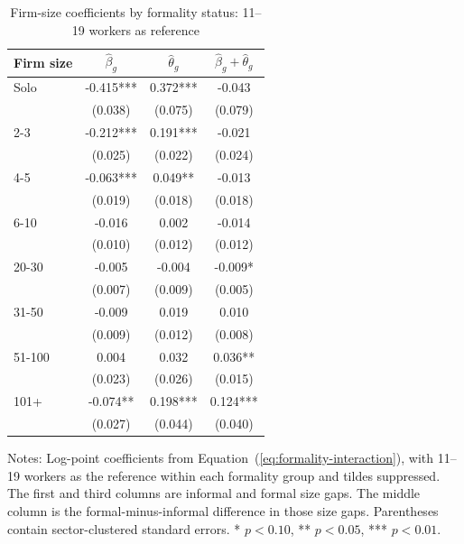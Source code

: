 \begin{table}[htbp]
  \centering
  \caption{Firm-size coefficients by formality status: 11--19 workers as reference}
  \label{tab:formality-interaction-coefficients-11-19-reference}
  \small
  \begin{tabular}{lccc}
    \toprule
    Firm size & $\hat{\beta}_g$ & $\hat{\theta}_g$ & $\hat{\beta}_g+\hat{\theta}_g$ \\
    \midrule
    Solo & -0.415*** & 0.372*** & -0.043 \\
     & (0.038) & (0.075) & (0.079) \\
    2-3 & -0.212*** & 0.191*** & -0.021 \\
     & (0.025) & (0.022) & (0.024) \\
    4-5 & -0.063*** & 0.049** & -0.013 \\
     & (0.019) & (0.018) & (0.018) \\
    6-10 & -0.016 & 0.002 & -0.014 \\
     & (0.010) & (0.012) & (0.012) \\
    20-30 & -0.005 & -0.004 & -0.009* \\
     & (0.007) & (0.009) & (0.005) \\
    31-50 & -0.009 & 0.019 & 0.010 \\
     & (0.009) & (0.012) & (0.008) \\
    51-100 & 0.004 & 0.032 & 0.036** \\
     & (0.023) & (0.026) & (0.015) \\
    101+ & -0.074** & 0.198*** & 0.124*** \\
     & (0.027) & (0.044) & (0.040) \\
    \bottomrule
  \end{tabular}
  \vspace{0.3em}
  \begin{minipage}{0.92\textwidth}
  \footnotesize
  Notes: Log-point coefficients from Equation~(\ref{eq:formality-interaction}), with 11--19 workers as the reference within each formality group and tildes suppressed. The first and third columns are informal and formal size gaps. The middle column is the formal-minus-informal difference in those size gaps. Parentheses contain sector-clustered standard errors. * $p<0.10$, ** $p<0.05$, *** $p<0.01$.
  \end{minipage}
\end{table}
